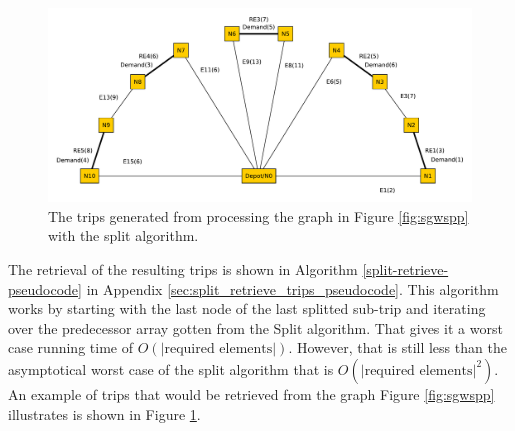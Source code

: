 \begin{figure}[thbp]
    \centerline{\includegraphics[width=\textwidth]{figures/SplitIllustrations/Split_GraphWithRoutes.pdf}}
    \caption{The trips generated from processing the graph in Figure \ref{fig:sgwspp} with the split algorithm.}
    \label{fig:sgwr}
\end{figure}

The retrieval of the resulting trips is shown in Algorithm \ref{split-retrieve-pseudocode} in Appendix \ref{sec:split_retrieve_trips_pseudocode}. This algorithm works by starting with the last node of the last splitted sub-trip and iterating over the predecessor array gotten from the Split algorithm. That gives it a worst case running time of $O(|\text{required elements}|)$. However, that is still less than the asymptotical worst case of the split algorithm that is $O(|\text{required elements}|^2)$. An example of trips that would be retrieved from the graph Figure \ref{fig:sgwspp} illustrates is shown in Figure \ref{fig:sgwr}.






\cleardoublepage
